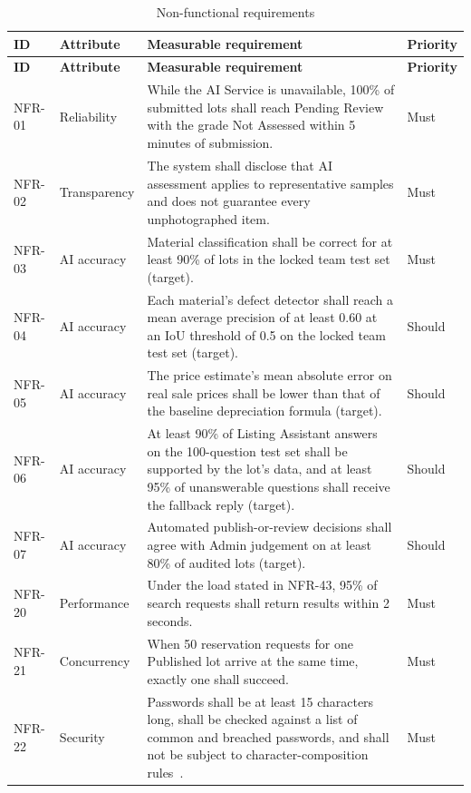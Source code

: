 {\footnotesize
\begin{longtable}{@{}p{}p{}p{}p{}@{}}
\caption{Non-functional requirements}\label{tab:nonfunctional-requirements}\\
\toprule
\textbf{ID} & \textbf{Attribute} & \textbf{Measurable requirement} & \textbf{Priority} \\
\midrule
\endfirsthead
\toprule
\textbf{ID} & \textbf{Attribute} & \textbf{Measurable requirement} & \textbf{Priority} \\
\midrule
\endhead
NFR-01 & Reliability & While the AI Service is unavailable, 100\% of submitted lots shall reach Pending Review with the grade Not Assessed within 5 minutes of submission. & Must \\
NFR-02 & Transparency & The system shall disclose that AI assessment applies to representative samples and does not guarantee every unphotographed item. & Must \\
NFR-03 & AI accuracy & Material classification shall be correct for at least 90\% of lots in the locked team test set (target). & Must \\
NFR-04 & AI accuracy & Each material's defect detector shall reach a mean average precision of at least 0.60 at an IoU threshold of 0.5 on the locked team test set (target). & Should \\
NFR-05 & AI accuracy & The price estimate's mean absolute error on real sale prices shall be lower than that of the baseline depreciation formula (target). & Should \\
NFR-06 & AI accuracy & At least 90\% of Listing Assistant answers on the 100-question test set shall be supported by the lot's data, and at least 95\% of unanswerable questions shall receive the fallback reply (target). & Should \\
NFR-07 & AI accuracy & Automated publish-or-review decisions shall agree with Admin judgement on at least 80\% of audited lots (target). & Should \\
NFR-20 & Performance & Under the load stated in NFR-43, 95\% of search requests shall return results within 2 seconds. & Must \\
NFR-21 & Concurrency & When 50 reservation requests for one Published lot arrive at the same time, exactly one shall succeed. & Must \\
NFR-22 & Security & Passwords shall be at least 15 characters long, shall be checked against a list of common and breached passwords, and shall not be subject to character-composition rules~\citep{nist80063b4}. & Must \\

\end{longtable}}
